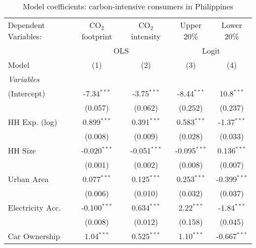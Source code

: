 
\begin{table}[htbp!]
   \centering
   \small
   \begin{adjustbox}{width = 1\textwidth, max height = 0.95\textheight, center}
      \begin{threeparttable}[b]
         \caption{\label{tab:Logit_1_PHL} Model coefficients: carbon-intensive consumers in Philippines}
         \begin{tabular}{lcccc}
            \tabularnewline \midrule \midrule
            Dependent Variables: & CO$_{2}$ footprint & CO$_{2}$ intensity & Upper 20\%     & Lower 20\%\\   
             & \multicolumn{2}{c}{OLS} & \multicolumn{2}{c}{Logit} \\ 
            Model                & (1)                & (2)                & (3)            & (4)\\  
            \midrule
            \emph{Variables}\\
            (Intercept)          & -7.34$^{***}$      & -3.75$^{***}$      & -8.44$^{***}$  & 10.8$^{***}$\\   
                                 & (0.057)            & (0.062)            & (0.252)        & (0.237)\\   
            HH Exp. (log)        & 0.899$^{***}$      & 0.391$^{***}$      & 0.583$^{***}$  & -1.37$^{***}$\\   
                                 & (0.008)            & (0.009)            & (0.028)        & (0.033)\\   
            HH Size              & -0.020$^{***}$     & -0.051$^{***}$     & -0.095$^{***}$ & 0.136$^{***}$\\   
                                 & (0.001)            & (0.002)            & (0.008)        & (0.007)\\   
            Urban Area           & 0.077$^{***}$      & 0.125$^{***}$      & 0.253$^{***}$  & -0.399$^{***}$\\   
                                 & (0.006)            & (0.010)            & (0.032)        & (0.037)\\   
            Electricity Acc.     & -0.100$^{***}$     & 0.634$^{***}$      & 2.22$^{***}$   & -1.84$^{***}$\\   
                                 & (0.008)            & (0.012)            & (0.158)        & (0.045)\\   
            Car Ownership        & 1.04$^{***}$       & 0.525$^{***}$      & 1.10$^{***}$   & -0.667$^{***}$\\   

\end{tabular}
\end{threeparttable}
\end{adjustbox}
\end{table}
